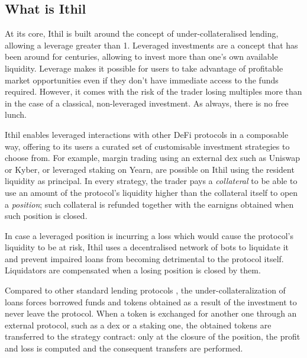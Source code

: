 \documentclass[a4paper,10 pt]{article}
\theoremstyle{definition}
\begin{document}
\subsection{What is Ithil}

At its core, Ithil is built around the concept of under-collateralised lending, allowing a leverage greater than 1.
Leveraged investments are a concept that has been around for centuries, allowing to invest more than one's own available liquidity. Leverage makes it possible for users to take advantage of profitable market opportunities even if they don't have immediate access to the funds required. However, it comes with the risk of the trader losing multiples more than in the case of a classical, non-leveraged investment. As always, there is no free lunch.

Ithil enables leveraged interactions with other DeFi protocols in a composable way, offering to its users a curated set of customisable investment strategies to choose from. For example, margin trading using an external dex such as Uniswap or Kyber, or leveraged staking on Yearn, are possible on Ithil using the resident liquidity as principal. In every strategy, the trader pays a {\it collateral} to be able to use an amount of the protocol's liquidity higher than the collateral itself to open a {\it position}; such collateral is refunded together with the earnigns obtained when such position is closed.

In case a leveraged position is incurring a loss which would cause the protocol's liquidity to be at risk, Ithil uses a decentralised network of bots to liquidate it and prevent impaired loans from becoming detrimental to the protocol itself. Liquidators are compensated when a losing position is closed by them.

Compared to other standard lending protocols \cite{yahooLending}, the under-collateralization of loans forces borrowed funds and tokens obtained as a result of the investment to never leave the protocol. When a token is exchanged for another one through an external protocol, such as a dex or a staking one, the obtained tokens are transferred to the strategy contract: only at the closure of the position, the profit and loss is computed and the consequent transfers are performed.
\end{document}

